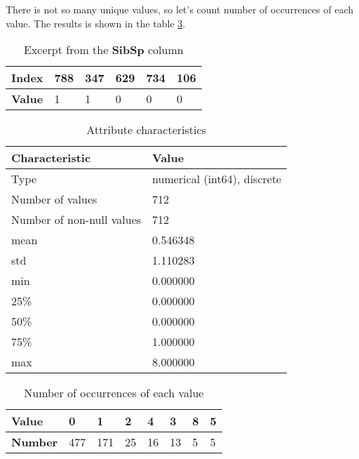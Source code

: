 There is not so many unique values, so let's count number of occurrences 
of each value. The results is shown in the table \ref{table:sibsp_value_counts}.

\begin{table}[!hp]
    \centering
    \caption{Excerpt from the \textbf{SibSp} column}
    \begin{tabular}{|l|l|l|l|l|l|}
        \hline
        \textbf{Index} & 788 & 347 & 629 & 734 & 106 \\ \hline
        \textbf{Value} & 1   & 1   & 0   & 0   & 0   \\ \hline
    \end{tabular}
    \label{table:sibsp_head}
\end{table}

\begin{table}[!hp]
    \centering
    \caption{Attribute characteristics}
    \begin{tabular}{|l|l|}
        \hline
        \textbf{Characteristic}   & \textbf{Value}              \\ \hline
        Type                      & numerical (int64), discrete \\ \hline
        Number of values          & 712                         \\ \hline
        Number of non-null values & 712                         \\ \hline
        mean                      & 0.546348                    \\ \hline
        std                       & 1.110283                    \\ \hline
        min                       & 0.000000                    \\ \hline
        25\%                      & 0.000000                    \\ \hline
        50\%                      & 0.000000                    \\ \hline
        75\%                      & 1.000000                    \\ \hline
        max                       & 8.000000                    \\ \hline
    \end{tabular}
    \label{table:sibsp_characteristics}
\end{table}

\begin{table}[!hp]
    \centering
    \caption{Number of occurrences of each value}
    \begin{tabular}{|l|l|l|l|l|l|l|l|}
        \hline
        \textbf{Value}  & 0   & 1   & 2  & 4  & 3  & 8 & 5 \\ \hline
        \textbf{Number} & 477 & 171 & 25 & 16 & 13 & 5 & 5 \\ \hline
    \end{tabular}
    \label{table:sibsp_value_counts}
\end{table}

